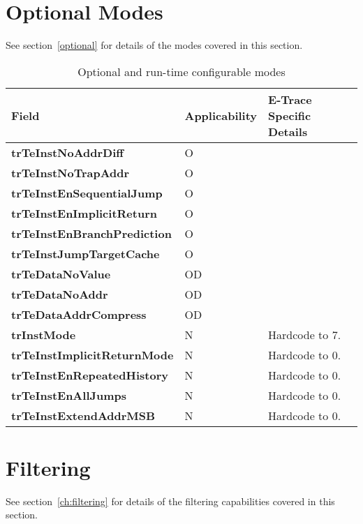\section{Optional Modes} \label{sec:ctl-modes}

See section~\ref{optional} for details of the modes covered in this section.

\begin{table}[htp]
  \centering
  \caption{Optional and run-time configurable modes}
  \label{tab:ctl-resync}
  \begin{tabulary}{\textwidth}{|l|l|p{90mm}|}
    \hline
    {\bf Field} & {\bf Applicability} & {\bf E-Trace Specific Details} \\
    \hline
    \textbf{trTeInstNoAddrDiff} & O & \\
    \hline
    \textbf{trTeInstNoTrapAddr} & O & \\
    \hline
    \textbf{trTeInstEnSequentialJump} & O & \\
    \hline
    \textbf{trTeInstEnImplicitReturn} & O & \\
    \hline
    \textbf{trTeInstEnBranchPrediction} & O & \\
    \hline
    \textbf{trTeInstJumpTargetCache} & O & \\
    \hline
    \textbf{trTeDataNoValue} & OD & \\
    \hline
    \textbf{trTeDataNoAddr} & OD & \\
    \hline
    \textbf{trTeDataAddrCompress} & OD & \\
    \hline
    \textbf{trInstMode} & N & Hardcode to 7.\\
    \hline
    \textbf{trTeInstImplicitReturnMode} & N & Hardcode to 0.\\
    \hline
    \textbf{trTeInstEnRepeatedHistory} & N & Hardcode to 0.\\
    \hline
    \textbf{trTeInstEnAllJumps} & N & Hardcode to 0.\\
    \hline
    \textbf{trTeInstExtendAddrMSB} & N & Hardcode to 0.\\
    \hline
  \end{tabulary}
\end{table}

\section{Filtering} \label{sec:ctl-filter}

See section~\ref{ch:filtering} for details of the filtering capabilities covered in this section.

